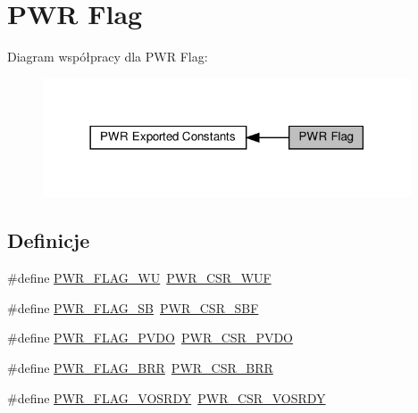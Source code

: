 \hypertarget{group___p_w_r___flag}{}\section{P\+WR Flag}
\label{group___p_w_r___flag}
Diagram współpracy dla P\+WR Flag\+:\nopagebreak
\begin{figure}[H]
\begin{center}
\leavevmode
\includegraphics[width=309pt]{group___p_w_r___flag}
\end{center}
\end{figure}
\subsection*{Definicje}
\begin{DoxyCompactItemize}
\item 
\#define \hyperlink{group___p_w_r___flag_ga2d06760a5769e729b06d41e37036d58e}{P\+W\+R\+\_\+\+F\+L\+A\+G\+\_\+\+WU}~\hyperlink{group___peripheral___registers___bits___definition_ga9465bb7ad9ca936688344e2a077539e6}{P\+W\+R\+\_\+\+C\+S\+R\+\_\+\+W\+UF}
\item 
\#define \hyperlink{group___p_w_r___flag_ga9e55f0b5dec2346d5c8dee3ab3c0c2df}{P\+W\+R\+\_\+\+F\+L\+A\+G\+\_\+\+SB}~\hyperlink{group___peripheral___registers___bits___definition_gab4fd42f153660593cad6f4fe22ff76bb}{P\+W\+R\+\_\+\+C\+S\+R\+\_\+\+S\+BF}
\item 
\#define \hyperlink{group___p_w_r___flag_gaefd05d58cc050eeef83a1b5c520b2c2a}{P\+W\+R\+\_\+\+F\+L\+A\+G\+\_\+\+P\+V\+DO}~\hyperlink{group___peripheral___registers___bits___definition_ga3535ce181895cc00afeb28dcac68d04c}{P\+W\+R\+\_\+\+C\+S\+R\+\_\+\+P\+V\+DO}
\item 
\#define \hyperlink{group___p_w_r___flag_ga4d4937c0a493bc2ff70e7e66c301c191}{P\+W\+R\+\_\+\+F\+L\+A\+G\+\_\+\+B\+RR}~\hyperlink{group___peripheral___registers___bits___definition_ga939410de980c5bc297ff04bcf30875cc}{P\+W\+R\+\_\+\+C\+S\+R\+\_\+\+B\+RR}
\item 
\#define \hyperlink{group___p_w_r___flag_ga7c0f807d7e91750a9bb571ca94dc5f71}{P\+W\+R\+\_\+\+F\+L\+A\+G\+\_\+\+V\+O\+S\+R\+DY}~\hyperlink{group___peripheral___registers___bits___definition_ga4126ed19cce54a5411ff8dd440171695}{P\+W\+R\+\_\+\+C\+S\+R\+\_\+\+V\+O\+S\+R\+DY}
\end{DoxyCompactItemize}


